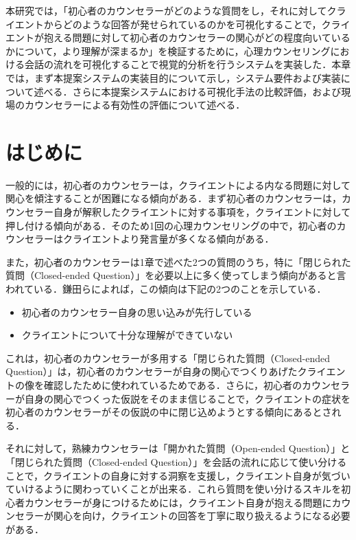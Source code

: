 \documentclass[shuuron]{kuee}
\begin{document}
本研究では，「初心者のカウンセラーがどのような質問をし，それに対してクライエントからどのような回答が発せられているのかを可視化することで，クライエントが抱える問題に対して初心者のカウンセラーの関心がどの程度向いているかについて，より理解が深まるか」を検証するために，心理カウンセリングにおける会話の流れを可視化することで視覚的分析を行うシステムを実装した．本章では，まず本提案システムの実装目的について示し，システム要件および実装について述べる．さらに本提案システムにおける可視化手法の比較評価，および現場のカウンセラーによる有効性の評価について述べる．

\section{はじめに}%





一般的には，初心者のカウンセラーは，クライエントによる内なる問題に対して関心を傾注することが困難になる傾向がある．まず初心者のカウンセラーは，カウンセラー自身が解釈したクライエントに対する事項を，クライエントに対して押し付ける傾向がある．そのため1回の心理カウンセリングの中で，初心者のカウンセラーはクライエントより発言量が多くなる傾向がある．

また，初心者のカウンセラーは1章で述べた2つの質問のうち，特に「閉じられた質問（Closed-ended Question）」を必要以上に多く使ってしまう傾向があると言われている．鎌田ら\cite{Darshana}によれば，この傾向は下記の2つのことを示している．
\begin{itemize}
  \item 初心者のカウンセラー自身の思い込みが先行している
  \item クライエントについて十分な理解ができていない
\end{itemize}


これは，初心者のカウンセラーが多用する「閉じられた質問（Closed-ended Question）」は，初心者のカウンセラーが自身の関心でつくりあげたクライエントの像を確認したために使われているためである．さらに，初心者のカウンセラーが自身の関心でつくった仮説をそのまま信じることで，クライエントの症状を初心者のカウンセラーがその仮説の中に閉じ込めようとする傾向にあるとされる．

それに対して，熟練カウンセラーは「開かれた質問（Open-ended Question）」と「閉じられた質問（Closed-ended Question）」を会話の流れに応じて使い分けることで，クライエントの自身に対する洞察を支援し，クライエント自身が気づいていけるように関わっていくことが出来る．これら質問を使い分けるスキルを初心者カウンセラーが身につけるためには，クライエント自身が抱える問題にカウンセラーが関心を向け，クライエントの回答を丁寧に取り扱えるようになる必要がある．
\end{document}
